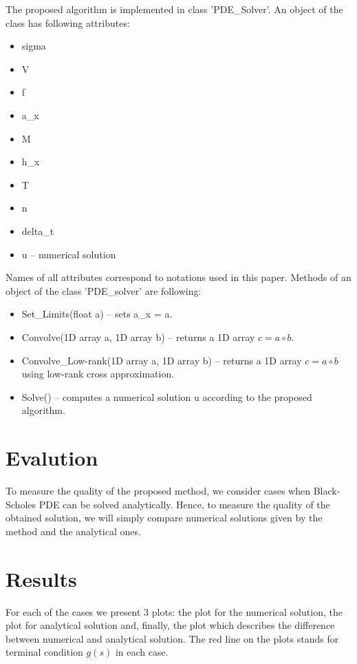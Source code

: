 \documentclass[11pt,a4paper]{extarticle}
\begin{document}
The proposed algorithm is implemented in class 'PDE\_Solver'.
An object of the class has following attributes:
\begin{itemize}
    \item sigma
    \item V
    \item f
    \item a\_x
    \item M
    \item h\_x
    \item T
    \item n
    \item delta\_t
    \item u -- numerical solution
\end{itemize}
Names of all attributes correspond to notations used in this paper.
Methods of an object of the class 'PDE\_solver' are following:
\begin{itemize}
    \item Set\_Limits(float a) -- sets a\_x = a.
    \item Convolve(1D array a, 1D array b) -- returns a 1D array $c = a \circ b$.
    \item Convolve\_Low-rank(1D array a, 1D array b) -- returns a 1D array $c = a \circ b$ using low-rank cross approximation.
    \item Solve() -- computes a numerical solution u according to the proposed algorithm.
\end{itemize}

\section{Evalution}

To measure the quality of the proposed method, we consider cases when Black-Scholes PDE can be solved analytically. Hence, to measure the quality of the obtained solution, we will simply compare numerical solutions given by the method and the analytical ones.

\section{Results}

For each of the cases we present 3 plots: the plot for the numerical solution, the plot for analytical solution and, finally, the plot which describes the difference between numerical and analytical solution. The red line on the plots stands for terminal condition $g(s)$ in each case.
\end{document}
